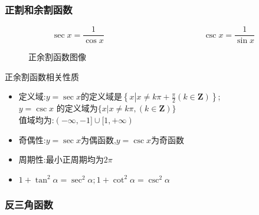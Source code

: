\documentclass[12pt, a4paper, oneside, UTF8]{ctexbook}  %
\begin{document}
\begin{sloppypar}
    \subsubsection{正割和余割函数}
    $$
        \boxed{\sec x=\frac{1}{\cos x}}
        \qquad  \qquad \qquad \qquad \qquad \qquad
        \boxed{\csc x=\frac{1}{\sin x}}
    $$
    \begin{figure}[H] \centering
        \caption{正余割函数图像}
    \end{figure}
    \begin{criterion}{正余割函数相关性质}{}
        \begin{itemize}
            \item 定义域:$y=\sec x$的定义域是$\left\{x\left|x\neq k\pi+\frac{\pi}{2}\left(k\in\mathbf{Z}\right)\right\}\right.$;\\$y=\csc x$ 的定义域为$\{x|x\neq k\pi,(k \in \mathbf{Z})\}$\\
                      值域均为:$(-\infty,-1]\cup[1,+\infty)$
            \item 奇偶性:$y=\sec x$为偶函数,$y=\csc x$为奇函数
            \item 周期性:最小正周期均为$ 2\pi$
            \item $1+\tan^{2}\alpha=\sec^{2}\alpha;1+\cot^{2}\alpha=\csc^{2}\alpha $
        \end{itemize}
    \end{criterion}
    \subsubsection{反三角函数}

\end{sloppypar}
\end{document}
